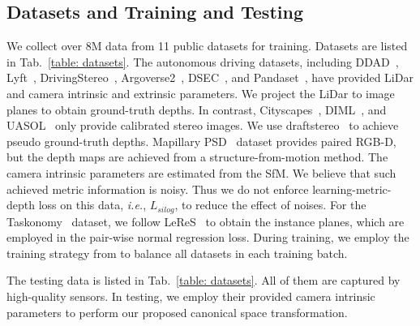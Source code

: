 
\subsection{Datasets and Training and Testing}
We collect over $8$M data from 11 public datasets for training. Datasets are listed in Tab.~\ref{table: datasets}. The autonomous driving datasets, including DDAD~\cite{packnet}, Lyft~\cite{lyftl5preception}, DrivingStereo~\cite{yang2019drivingstereo}, Argoverse2~\cite{Argoverse2}, DSEC~\cite{Gehrig21ral}, and Pandaset~\cite{itsc21pandaset}, have provided LiDar and camera intrinsic and extrinsic parameters. We project the LiDar to image planes to obtain ground-truth depths. In contrast, Cityscapes~\cite{Cordts2016Cityscapes}, DIML~\cite{cho2021diml}, and UASOL~\cite{bauer2019uasol} only provide calibrated stereo images. We use draftstereo~\cite{lipson2021raft} to achieve pseudo ground-truth depths. Mapillary PSD~\cite{MapillaryPSD} dataset provides paired RGB-D, but the depth maps are achieved from a structure-from-motion method. The camera intrinsic parameters are estimated from the SfM. We believe that such achieved metric information is noisy. Thus we do not enforce learning-metric-depth loss on this data, \textit{i.e.},  $L_{silog}$, to reduce the effect of noises. For the Taskonomy~\cite{zamir2018taskonomy} dataset, we follow LeReS~\cite{yin2022towards} to obtain the instance planes, which are employed in the pair-wise normal regression loss. During training, we employ the training strategy from \cite{yin2020diversedepth_old} to balance all datasets in each training batch. 

The testing data is listed in Tab.~\ref{table: datasets}. All of them are captured by high-quality sensors. In testing, we employ their provided camera intrinsic parameters to perform our proposed canonical space transformation. 



